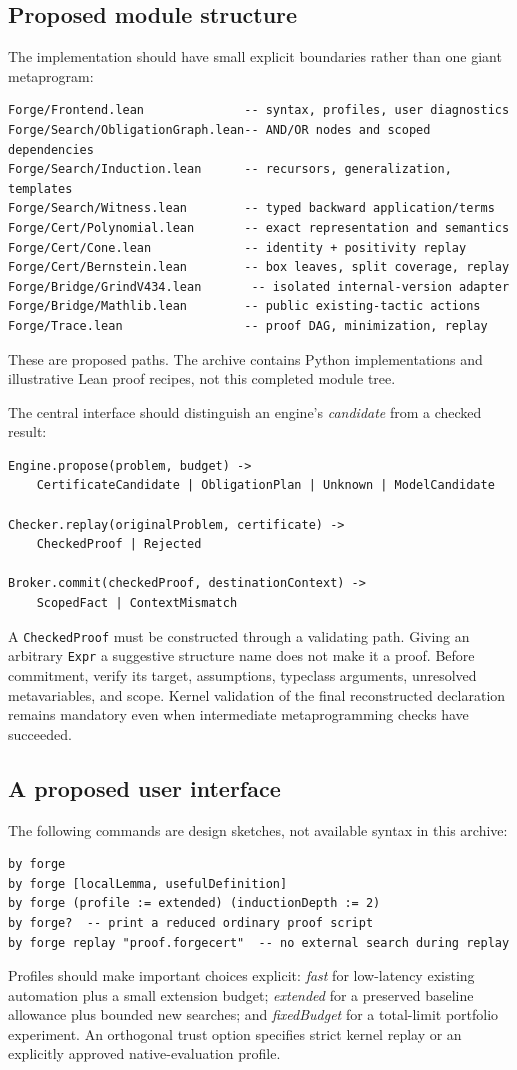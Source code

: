 \documentclass[11pt,a4paper]{article}
\newcommand{\code}[1]{\texttt{#1}}
\begin{document}
\subsection{Proposed module structure}
The implementation should have small explicit boundaries rather than one giant metaprogram:
\begin{lstlisting}
Forge/Frontend.lean              -- syntax, profiles, user diagnostics
Forge/Search/ObligationGraph.lean-- AND/OR nodes and scoped dependencies
Forge/Search/Induction.lean      -- recursors, generalization, templates
Forge/Search/Witness.lean        -- typed backward application/terms
Forge/Cert/Polynomial.lean       -- exact representation and semantics
Forge/Cert/Cone.lean             -- identity + positivity replay
Forge/Cert/Bernstein.lean        -- box leaves, split coverage, replay
Forge/Bridge/GrindV434.lean       -- isolated internal-version adapter
Forge/Bridge/Mathlib.lean        -- public existing-tactic actions
Forge/Trace.lean                 -- proof DAG, minimization, replay
\end{lstlisting}
These are proposed paths. The archive contains Python implementations and illustrative Lean proof recipes, not this completed module tree.

The central interface should distinguish an engine's \emph{candidate} from a checked result:
\begin{lstlisting}[caption={Conceptual interface, with deliberately abstract names.}]
Engine.propose(problem, budget) ->
    CertificateCandidate | ObligationPlan | Unknown | ModelCandidate

Checker.replay(originalProblem, certificate) ->
    CheckedProof | Rejected

Broker.commit(checkedProof, destinationContext) ->
    ScopedFact | ContextMismatch
\end{lstlisting}
A \code{CheckedProof} must be constructed through a validating path. Giving an arbitrary \code{Expr} a suggestive structure name does not make it a proof. Before commitment, verify its target, assumptions, typeclass arguments, unresolved metavariables, and scope. Kernel validation of the final reconstructed declaration remains mandatory even when intermediate metaprogramming checks have succeeded.

\subsection{A proposed user interface}
The following commands are design sketches, not available syntax in this archive:
\begin{lstlisting}
by forge
by forge [localLemma, usefulDefinition]
by forge (profile := extended) (inductionDepth := 2)
by forge?  -- print a reduced ordinary proof script
by forge replay "proof.forgecert"  -- no external search during replay
\end{lstlisting}
Profiles should make important choices explicit: \emph{fast} for low-latency existing automation plus a small extension budget; \emph{extended} for a preserved baseline allowance plus bounded new searches; and \emph{fixedBudget} for a total-limit portfolio experiment. An orthogonal trust option specifies strict kernel replay or an explicitly approved native-evaluation profile.
\end{document}
